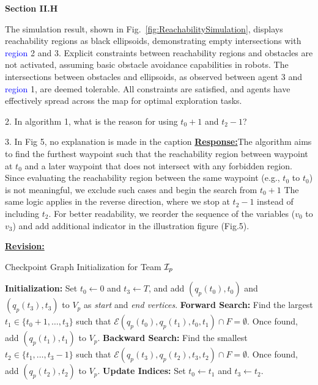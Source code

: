 \documentclass{article}
\newcommand{\re}{\tcblower \underline{\textbf{Response:}}\quad}
\newcommand{\rv}{{\large{\underline{\textbf{Revision:}}}}\quad}
\newcommand{\new}[1]{\textcolor{blue}{#1}}
\newcommand{\news}{\color{blue}}
\begin{document}
\textbf{Section II.H}

The simulation result, shown in Fig.~\ref{fig:ReachabilitySimulation}, displays reachability regions as black ellipsoids, demonstrating empty intersections with \new{region} 2 and 3. Explicit constraints between reachability regions and obstacles are not activated, assuming basic obstacle avoidance capabilities in robots. The intersections between obstacles and ellipsoids, as observed between agent 3 and \new{region} 1, are deemed tolerable. All constraints are satisfied, and agents have effectively spread across the map for optimal exploration tasks. 
\begin{cmt}{}{}
	2. In algorithm 1, what is the reason for using $t_0 + 1$ and $t_2 - 1$? 
	
	3. In Fig 5, no explanation is made in the caption
\re The algorithm aims to find the furthest waypoint such that the reachability region between waypoint at $t_0$ and a later waypoint that does not intersect with any forbidden region. Since evaluating the reachability region between the same waypoint (e.g., $t_0$ to $t_0$) is not meaningful, we exclude such cases and begin the search from $t_0 +1$ The same logic applies in the reverse direction, where we stop at $t_2 -1$ instead of including $t_2$. For better readability, we reorder the sequence of the variables ($v_0$ to $v_3$) and add additional indicator in the illustration figure (Fig.5).
\end{cmt}
\rv
\setcounter{figure}{4}
\begin{algorithm}
	\caption{Checkpoint Graph Initialization for Team $\mathcal{I}_p$}\label{alg:graph}
  \begin{algorithmic}[1]
	{\news \State \textbf{Initialization:} Set $t_{0} \leftarrow 0$ and $t_{3} \leftarrow T$, and add $(q_{p}(t_0),t_0)$ and $(q_{p}(t_3),t_3)$ to $V_{p}$ as \emph{start} and \emph{end vertices}.
		\State \textbf{Forward Search:} Find the largest $t_{1} \in \{t_{0}+1, \dots, t_3\}$ such that $\mathcal{E}(q_{p}(t_{0}),q_{p}(t_{1}), t_{0},t_{1}) \cap F = \emptyset$. Once found, add $(q_{p}(t_{1}),t_{1})$ to $V_{p}$.
		\State \textbf{Backward Search:} Find the smallest $t_2\in\{t_{1}, \dots, t_3-1\}$ such that $
		\mathcal{E}(q_{p}(t_3),q_{p}(t_2), t_3,t_2) \cap F = \emptyset.$ Once found, add $(q_{p}(t_2),t_2)$ to $V_{p}$.
		\State \textbf{Update Indices:} Set $t_{0} \leftarrow t_{1}$ and $t_3 \leftarrow t_2$.
	\EndWhile}
	\end{algorithmic}
	\end{algorithm}
\end{document}
